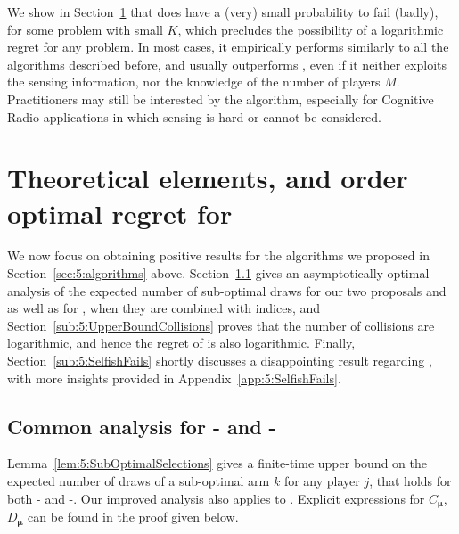 We show in Section~\ref{sec:5:upperbounds} that \Selfish{} does have a (very) small probability to fail (badly), for some problem with small $K$,
which precludes the possibility of a logarithmic regret for any problem.
In most cases, it empirically performs similarly to all the algorithms described before,
and usually outperforms \rhoRand,
even if it neither exploits the sensing information, nor the knowledge of the number of players $M$.
%
Practitioners may still be interested by the algorithm, especially for Cognitive Radio applications in which sensing is hard or cannot be considered.




\section{Theoretical elements, and order optimal regret for \MCTopM}
\label{sec:5:upperbounds}

We now focus on obtaining positive results for the algorithms we proposed in Section~\ref{sec:5:algorithms} above.
Section~\ref{sub:5:UpperBoundSelections} gives
an asymptotically optimal analysis of the expected number of sub-optimal draws
for our two proposals \RandTopM{} and \MCTopM{} as well as for \rhoRand{}, when they are combined with \klUCB{} indices,
and Section~\ref{sub:5:UpperBoundCollisions} proves that the number of collisions are logarithmic, and hence the regret of \MCTopM{} is also logarithmic.
%
Finally, Section~\ref{sub:5:SelfishFails} shortly discusses a disappointing result regarding \Selfish{}, with more insights provided in Appendix~\ref{app:5:SelfishFails}.


\subsection{Common analysis for \RandTopM- and \MCTopM-\klUCB{}}\label{sub:5:UpperBoundSelections}

Lemma~\ref{lem:5:SubOptimalSelections} gives a finite-time upper bound on the expected number of draws of a sub-optimal arm $k$ for any player $j$, that
holds for both \RandTopM-\klUCB{} and \MCTopM-\klUCB.
Our improved analysis also applies to \rhoRand{}.
Explicit expressions for $C_{\boldsymbol{\mu}}$, $D_{\boldsymbol{\mu}}$ can be found in the proof given below.

